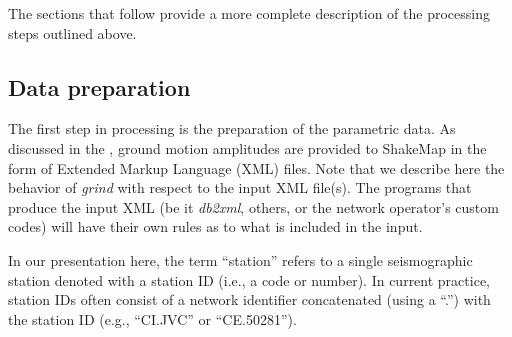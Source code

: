 \documentclass[letterpaper,10pt,english]{sphinxmanual}
\begin{document}
\begin{figure}[htbp]\begin{flushleft}
\capstart

\texttt{[image: \{ProcessingFigure]}.pdf}
\caption{A schematic of the basic ShakeMap ground motion interpolation scheme.}\label{tg_processing:figure-processing}\label{tg_processing:id2}\end{flushleft}\end{figure}

The sections that follow provide a more complete description of the processing steps outlined
above.


\subsection{Data preparation}
\label{tg_processing:data-preparation}
The first step in processing is the preparation of the parametric data. As discussed in the
{\hyperref[software_guide:sm35\string-software\string-guide]{}}, ground motion amplitudes are provided to ShakeMap in the form of
Extended Markup Language (XML) files. Note that we describe here the behavior of
\emph{grind} with respect to the input XML file(s). The programs that produce the input XML
(be it \emph{db2xml}, others, or the network operator's custom codes) will have their own rules
as to what is included in the input.

In our presentation here, the term “station” refers to a single seismographic station
denoted with a station ID (i.e., a code or number). In current practice, station IDs often
consist of a network identifier concatenated (using a “.”) with the station ID (e.g.,
“CI.JVC” or “CE.50281”).
\end{document}
